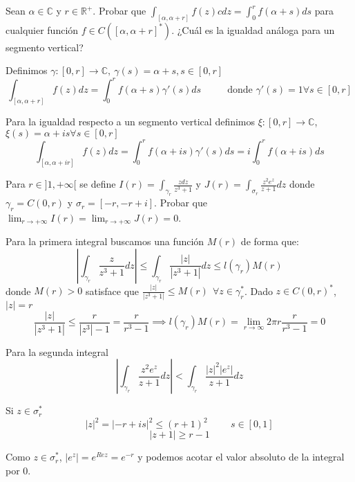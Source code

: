 \begin{ejer}
	Sean $\alpha\in\mathbb{C}$ y $r\in\mathbb{R}^+$. Probar que $\int_{[\alpha,\alpha+r]}f(z)cdz = \int_{0}^{r} f(\alpha +s)ds$ para cualquier función $f\in C([\alpha,\alpha+r]^{\ast})$. ¿Cuál es la igualdad análoga para un segmento vertical?
\end{ejer}

\begin{sol}

Definimos $\gamma :[0,r] \rightarrow \mathbb{C}, \ \gamma (s) = \alpha + s, s\in[0,r]$
$$\int_{[\alpha,\alpha + r]} f(z)dz = \int_{0}^{r} f(\alpha +s)\gamma ' (s)ds \hspace{1cm}\text{ donde }\gamma ' (s) = 1 \forall s\in [0,r]$$

Para la igualdad respecto a un segmento vertical definimos $\xi : [0,r] \rightarrow \mathbb{C}$, $\xi(s) = \alpha +is \forall s\in[0,r]$
$$\int_{[\alpha,\alpha + ir]} f(z)dz = \int_0^r f(\alpha + is) \gamma ' (s)ds = i\int_0^r f(\alpha +is)ds$$

\end{sol}



\begin{ejer}
	Para $r\in]1,+\infty[$ se define $I(r) = \int_{\gamma_r} \frac{zdz}{z^3+1}$ y $J(r) = \int_{\sigma_r} \frac{z^2e^z}{z+1}dz$ donde $\gamma_r=C(0,r)$ y $\sigma_r = [-r,-r+i]$. Probar que $\lim_{r\rightarrow+\infty} I(r) = \lim_{r\rightarrow+\infty} J(r) = 0$.
\end{ejer}

\begin{sol}
Para la primera integral buscamos una función $M(r)$ de forma que:
$$\left| \int_{\gamma_r} \frac{z}{z^3+1}dz \right| \leq \int_{\gamma_r} \frac{|z|}{|z^3+1|} dz \leq l(\gamma_r)M(r)$$
donde $M(r)>0$ satisface que $\frac{|z|}{|z^3+1|} \leq M(r) \ \ \forall z\in\gamma_r^{\ast}$. Dado $z\in C(0,r)^{\ast}$, $|z| = r $
$$\frac{|z|}{|z^3+1|} \leq \frac{r}{|z^3|-1} = \frac{r}{r^3-1} \implies l(\gamma_r)M(r) = \lim_{r\rightarrow\infty} 2\pi r\frac{r}{r^3-1} = 0$$



Para la segunda integral
$$\left| \int_{\gamma_r} \frac{z^2 e^z}{z+1}dz \right| < \int_{\gamma_r} \frac{|z|^2 |e^z|}{z+1}dz$$

Si $z\in\sigma_r^{\ast}$
$$ |z|^2 = |-r+is|^2 \leq (r+1)^2 \hspace{1cm} s\in[0,1] $$
$$ |z+1| \geq r-1 $$

Como $z\in\sigma_r^{\ast}$, $|e^z| = e^{Rez} = e^{-r}$ y podemos acotar el valor absoluto de la integral por $0$.

\end{sol}


